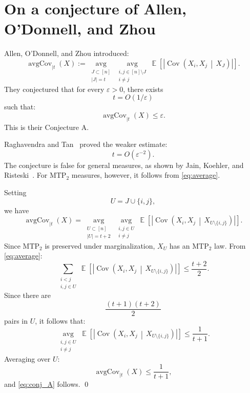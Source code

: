 \documentclass[12pt,reqno]{amsart}
\makeatletter
\renewenvironment{proof}[1][\proofname]{%
  \par\vspace{\topsep}%
  \normalfont\topsep6\p@\@plus6\p@\relax
  \trivlist
  \item[\hskip\labelsep\itshape #1\@addpunct{.}]\ignorespaces
}{%
  \endtrivlist
}
\numberwithin{equation}{section}
\DeclareMathOperator{\E}{\mathbb{E}}
\DeclareMathOperator{\Cov}{Cov} \newcommand{\MTP}{\mathrm{MTP}_2}
\makeatother
\begin{document}
\section{On a conjecture of Allen, 
O'Donnell, and Zhou}\label{ODonnell}

Allen, O'Donnell, and Zhou \cite{AllenODonnell} introduced:
\[
\operatorname{avgCov}_{\mid t}(X)
:=
\operatorname*{avg}_{\substack{J\subset[n]\\ |J|=t}}
\operatorname*{avg}_{\substack{i,j\in[n]\setminus J\\ i\ne j}}
\E\!\left[
\left|
\Cov\!\left(
X_i,X_j
\,\middle|\,
X_J
\right)
\right|
\right].
\]
They conjectured that for every
\(\varepsilon>0\), there exists
\[
t=O(1/\varepsilon)
\]
such that:
\begin{equation}\label{eq:conj_A}
\operatorname{avgCov}_{\mid t}(X)\le\varepsilon.
\end{equation}
This is their Conjecture A. 
\smallskip%

Raghavendra and Tan~\cite{RagTan} proved the weaker estimate:
\[
t=O(\varepsilon^{-2}).
\]
The conjecture is false for general measures, as 
shown by Jain, Koehler, and Risteski~\cite{Jain19}. For \(\MTP\) measures, however, it follows from 
\eqref{eq:average}.
\begin{proof}
Setting
\[
U = J \cup \{i,j\},
\]
we have
\[
\operatorname{avgCov}_{\mid t}(X)
=
\operatorname*{avg}_{\substack{U\subset[n]\\ |U|=t+2}}
\operatorname*{avg}_{\substack{i,j\in U\\ i\ne j}}
\E\!\left[
\left|
\Cov\!\left(
X_i,X_j
\,\middle|\,
X_{U\setminus\{i,j\}}
\right)
\right|
\right].
\]
Since \(\MTP\) is preserved under marginalization, \(X_U\) has an \(\MTP\) law. From
\eqref{eq:average}:
\[
\sum_{\substack{i<j\\ i,j\in U}}
\E\!\left[
\left|
\Cov\!\left(
X_i,X_j
\,\middle|\,
X_{U\setminus\{i,j\}}
\right)
\right|
\right]
\le
\frac{t+2}{2}.
\]
Since there are
\[
\frac{(t+1)(t+2)}{2}
\]
pairs in \(U\), it follows that:
\[
\operatorname*{avg}_{\substack{i,j\in U\\ i\ne j}}
\E\!\left[
\left|
\Cov\!\left(
X_i,X_j
\,\middle|\,
X_{U\setminus\{i,j\}}
\right)
\right|
\right]
\le
\frac{1}{t+1}.
\]
Averaging over \(U\):
\[
\operatorname{avgCov}_{\mid t}(X)
\le
\frac{1}{t+1},
\]
and \eqref{eq:conj_A} follows. \qed
\end{proof}



\end{document}
